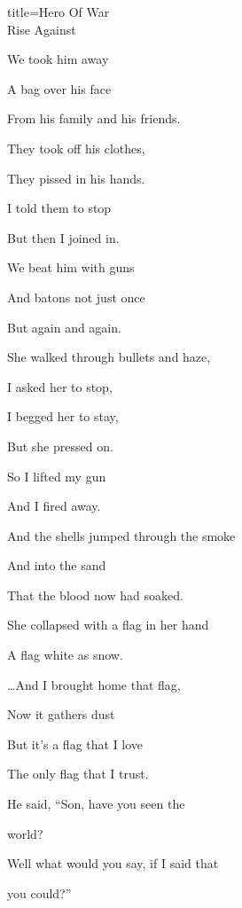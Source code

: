 \begin{song}{title=\predtitle\centering Hero Of War\\\large Rise Against \vspace*{-0.3cm}}
\begin{centerjustified}
\begin{varwidth}[t]{0.48\textwidth}
We took him away

A bag over his face

From his family and his friends.

\sloka
They took off his clothes,

They pissed in his hands.

I told them to stop

But then I joined in.

We beat him with guns

And batons not just once

But again and again.


\sloka
She walked through bullets and haze,

I asked her to stop,

I begged her to stay,

But she pressed on.

So I lifted my gun

And I fired away.

\sloka
And the shells jumped through the smoke

And into the sand

That the blood now had soaked.

She collapsed with a flag in her hand

A flag white as snow.


\dots And I brought home that flag,

Now it gathers dust

But it's a flag that I love

The only flag that I trust.


He said, ``Son, have you seen the

world?

Well what would you say, if I said that

you could?''

\end{varwidth}

\end{centerjustified}
\setcounter{Slokočet}{0}
\end{song}
